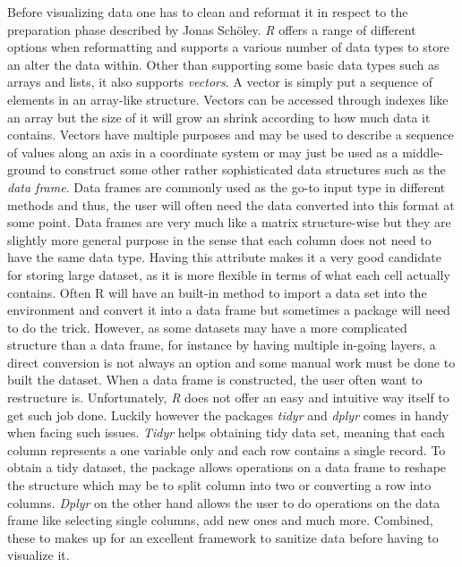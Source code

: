 \documentclass[11pt]{article}
\begin{document}
 Before visualizing data one has to clean and reformat it in respect to the preparation phase described by Jonas Schöley. \textit{R} offers a range of different options when reformatting and supports a various number of data  types to store an alter the data within. Other than supporting some basic data types such as arrays and lists, it also supports \textit{vectors}. A vector is simply put a sequence of elements in an array-like structure. Vectors can be accessed through indexes like an array but the size of it will grow an shrink according to how much data it contains. Vectors have multiple purposes and may be used to describe a sequence of values along an axis in a coordinate system or may just be used as a middle-ground to construct some other rather sophisticated data structures such as the \textit{data frame}. Data frames are commonly used as the go-to input type in different methods and thus, the user will often need the data converted into this format at some point. Data frames are very much like a matrix structure-wise but they are slightly more general purpose in the sense that each column does not need to have the same data type. Having this attribute makes it a very good candidate for storing large dataset, as it is more flexible in terms of what each cell actually contains. Often R will have an built-in method to import a data set into the environment and convert it into a data frame but sometimes a package will need to do the trick. However, as some datasets may have a more complicated structure than a data frame, for instance by having multiple in-going layers, a direct conversion is not always an option and some manual work must be done to built the dataset. When a data frame is constructed, the user often want to restructure is. Unfortunately, \textit{R} does not offer an easy and intuitive way itself to get such job done. Luckily however the packages \textit{tidyr} and  \textit{dplyr} comes in handy when facing such issues. \textit{Tidyr} helps obtaining tidy data set, meaning that each column represents a one variable only and each row contains a single record. To obtain a tidy dataset, the package allows operations on a data frame to reshape the structure which may be to split column into two or converting a row into columns. \textit{Dplyr} on the other hand allows the user to do operations on the data frame like selecting single columns, add new ones and much more. Combined, these to makes up for an excellent framework to sanitize data before having to visualize it.\\
 
\end{document}

